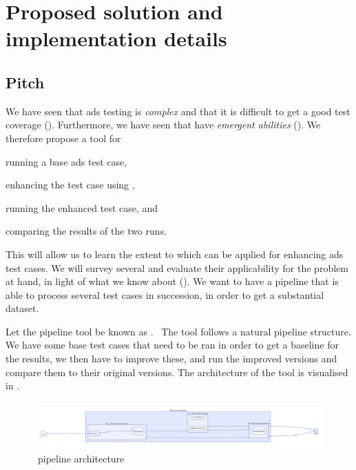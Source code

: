 \chapter{Proposed solution and implementation details}\label{sec:solutionProposal}

\section{Pitch}

We have seen that \acrshort{ads} testing is \textit{complex} and that it is difficult to get a good
test coverage (). Furthermore, we have seen that 
have \textit{emergent abilities} (). We therefore propose a tool for
\begin{inparaenum}
    \item running a base \acrshort{ads} test case,
    \item enhancing the test case using ,
    \item running the enhanced test case, and
    \item comparing the results of the two runs.
\end{inparaenum}

This will allow us to learn the extent to which  can be applied for enhancing
\acrlong{ads} test cases. We will survey several  and evaluate their applicability
for the problem at hand, in light of what we know about  (). We
want to have a pipeline that is able to process several test cases in succession, in order to get a
substantial dataset.

Let the pipeline tool be known as \hefe.~%
The tool follows a natural pipeline structure. We have some base test cases that
need to be ran in order to get a baseline for the results, we then have to
improve these, and run the improved versions and compare them to their original
versions. The architecture of the tool is visualised in .

\begin{figure}[h]
    \centering
    \includegraphics[width=\textwidth]{figures/d2-pdf/hefe.pdf}
    \caption{\hefe~pipeline architecture}\label{fig:hefeArch}
\end{figure}


